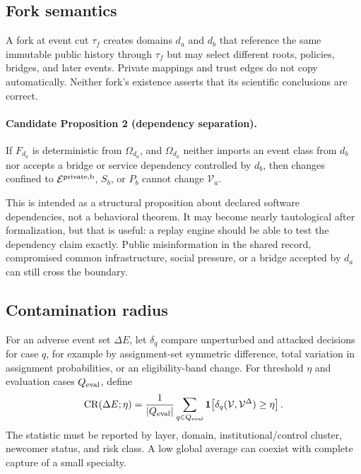 \documentclass[11pt]{article}
\newcommand{\view}{\mathcal{V}}
\newcommand{\events}{\mathcal{E}}
\newcommand{\ind}{\mathbf{1}}
\newcommand{\CR}{\operatorname{CR}}
\begin{document}
\subsection{Fork semantics}

A fork at event cut $\tau_f$ creates domains $d_a$ and $d_b$ that reference the same immutable public history through $\tau_f$ but may select different roots, policies, bridges, and later events.  Private mappings and trust edges do not copy automatically.  Neither fork's existence asserts that its scientific conclusions are correct.

\paragraph{Candidate Proposition 2 (dependency separation).}
If $F_{d_a}$ is deterministic from $\Omega_{d_a}$, and $\Omega_{d_a}$ neither imports an event class from $d_b$ nor accepts a bridge or service dependency controlled by $d_b$, then changes confined to $\events^{\rm private,b}$, $S_b$, or $P_b$ cannot change $\view_a$.

This is intended as a structural proposition about declared software dependencies, not a behavioral theorem.  It may become nearly tautological after formalization, but that is useful: a replay engine should be able to test the dependency claim exactly.  Public misinformation in the shared record, compromised common infrastructure, social pressure, or a bridge accepted by $d_a$ can still cross the boundary.

\subsection{Contamination radius}

For an adverse event set $\Delta E$, let $\delta_q$ compare unperturbed and attacked decisions for case $q$, for example by assignment-set symmetric difference, total variation in assignment probabilities, or an eligibility-band change.  For threshold $\eta$ and evaluation cases $Q_{\rm eval}$, define
\begin{equation}
 \CR(\Delta E;\eta)=\frac{1}{|Q_{\rm eval}|}
 \sum_{q\in Q_{\rm eval}}\ind\!\left[
 \delta_q(\view,\view^{\Delta})\geq\eta\right].
 \label{eq:cr}
\end{equation}
The statistic must be reported by layer, domain, institutional/control cluster, newcomer status, and risk class.  A low global average can coexist with complete capture of a small specialty.
\end{document}
